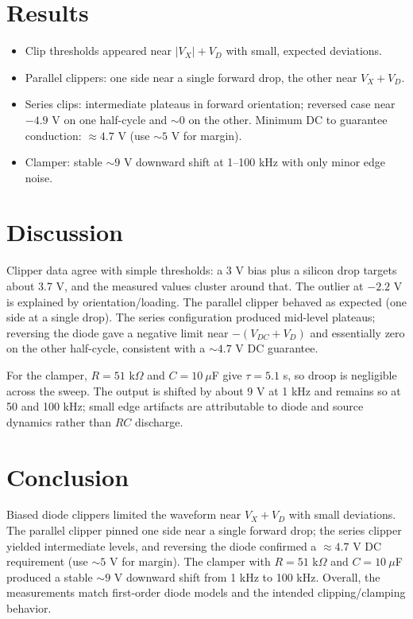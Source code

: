 \documentclass[12pt]{article}
\begin{document}
\section{Results}
\begin{itemize}
  \item Clip thresholds appeared near $|V_X|+V_D$ with small, expected deviations.
  \item Parallel clippers: one side near a single forward drop, the other near $V_X+V_D$.
  \item Series clips: intermediate plateaus in forward orientation; reversed case near $-4.9$ V on one half-cycle and $\sim 0$ on the other. Minimum DC to guarantee conduction: $\approx 4.7$ V (use $\sim 5$ V for margin).
  \item Clamper: stable $\sim 9$ V downward shift at 1–100 kHz with only minor edge noise.
\end{itemize}

\section{Discussion}
Clipper data agree with simple thresholds: a 3 V bias plus a silicon drop targets about 3.7 V, and the measured values cluster around that. The outlier at $-2.2$ V is explained by orientation/loading. The parallel clipper behaved as expected (one side at a single drop). The series configuration produced mid-level plateaus; reversing the diode gave a negative limit near $-(V_{DC}+V_D)$ and essentially zero on the other half-cycle, consistent with a $\sim 4.7$ V DC guarantee.

For the clamper, $R=51$ k$\Omega$ and $C=10~\mu$F give $\tau=5.1$ s, so droop is negligible across the sweep. The output is shifted by about 9 V at 1 kHz and remains so at 50 and 100 kHz; small edge artifacts are attributable to diode and source dynamics rather than $RC$ discharge.

\section{Conclusion}
Biased diode clippers limited the waveform near $V_X+V_D$ with small deviations. The parallel clipper pinned one side near a single forward drop; the series clipper yielded intermediate levels, and reversing the diode confirmed a $\approx 4.7$ V DC requirement (use $\sim 5$ V for margin). The clamper with $R=51$ k$\Omega$ and $C=10~\mu$F produced a stable $\sim 9$ V downward shift from 1 kHz to 100 kHz. Overall, the measurements match first-order diode models and the intended clipping/clamping behavior.
\end{document}

